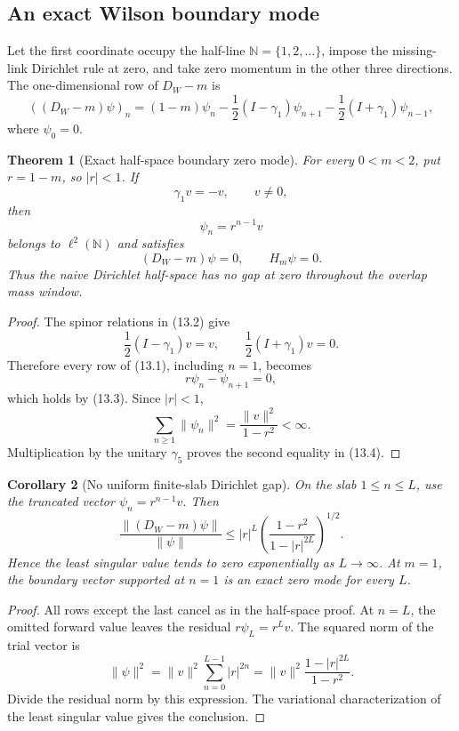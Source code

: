 \documentclass[11pt]{article}
\newtheorem{theorem}{Theorem}[section]
\newtheorem{corollary}[theorem]{Corollary}
\begin{document}
\subsection{An exact Wilson boundary mode}

Let the first coordinate occupy the half-line
\(\mathbb N=\{1,2,\ldots\}\), impose the missing-link Dirichlet rule at
zero, and take zero momentum in the other three directions.  The
one-dimensional row of \(D_W-m\) is
\[
 ((D_W-m)\psi)_n
 =
 (1-m)\psi_n
 -\frac12(I-\gamma_1)\psi_{n+1}
 -\frac12(I+\gamma_1)\psi_{n-1},
 \tag{13.1}
\]
where \(\psi_0=0\).

\begin{theorem}[Exact half-space boundary zero mode]
\label{thm:v11v13-half-space}
For every \(0<m<2\), put \(r=1-m\), so \(|r|<1\).  If
\[
 \gamma_1v=-v,\qquad v\ne0,
 \tag{13.2}
\]
then
\[
 \psi_n=r^{n-1}v
 \tag{13.3}
\]
belongs to \(\ell^2(\mathbb N)\) and satisfies
\[
 (D_W-m)\psi=0,\qquad H_m\psi=0.
 \tag{13.4}
\]
Thus the naive Dirichlet half-space has no gap at zero throughout the
overlap mass window.
\end{theorem}

\begin{proof}
The spinor relations in (13.2) give
\[
 \frac12(I-\gamma_1)v=v,\qquad
 \frac12(I+\gamma_1)v=0.
\]
Therefore every row of (13.1), including \(n=1\), becomes
\[
 r\psi_n-\psi_{n+1}=0,
\]
which holds by (13.3).  Since \(|r|<1\),
\[
 \sum_{n\geq1}\|\psi_n\|^2
 =
 \frac{\|v\|^2}{1-r^2}<\infty.
\]
Multiplication by the unitary \(\gamma_5\) proves the second equality in
(13.4).
\end{proof}

\begin{corollary}[No uniform finite-slab Dirichlet gap]
\label{cor:v11v13-slab}
On the slab \(1\leq n\leq L\), use the truncated vector
\(\psi_n=r^{n-1}v\).  Then
\[
 \frac{\|(D_W-m)\psi\|}{\|\psi\|}
 \leq
 |r|^L
 \left(\frac{1-r^2}{1-|r|^{2L}}\right)^{1/2}.
 \tag{13.5}
\]
Hence the least singular value tends to zero exponentially as
\(L\to\infty\).  At \(m=1\), the boundary vector supported at \(n=1\)
is an exact zero mode for every \(L\).
\end{corollary}

\begin{proof}
All rows except the last cancel as in the half-space proof.  At \(n=L\),
the omitted forward value leaves the residual \(r\psi_L=r^Lv\).
The squared norm of the trial vector is
\[
 \|\psi\|^2
 =
 \|v\|^2\sum_{n=0}^{L-1}|r|^{2n}
 =
 \|v\|^2\frac{1-|r|^{2L}}{1-r^2}.
\]
Divide the residual norm by this expression.  The variational
characterization of the least singular value gives the conclusion.
\end{proof}
\end{document}
